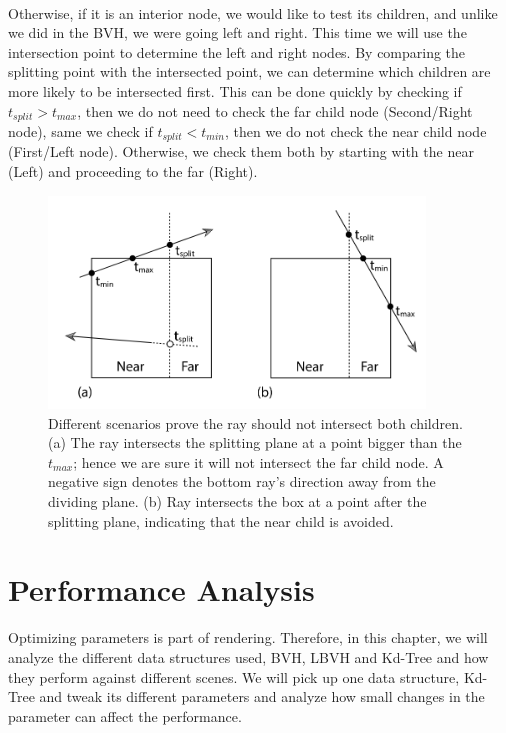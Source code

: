 \documentclass[11pt,a4paper]{article}
\begin{document}
\noindent
\\
Otherwise, if it is an interior node, we would like to test its children, and unlike we did in the BVH, we were going left and right. This time we will use the intersection point to determine the left and right nodes. By comparing the splitting point with the intersected point, we can determine which children are more likely to be intersected first. This can be done quickly by checking if $t_{split} > t_{max}$, then we do not need to check the far child node (Second/Right node), same we check if $t_{split} < t_{min}$, then we do not check the near child node (First/Left node). Otherwise, we check them both by starting with the near (Left) and proceeding to the far (Right).   

\begin{figure}[H]	
     \centering
     \captionsetup{justification=centering,margin=2cm}
     \includegraphics[width=10cm]{images/kdtree/traversal_case.png}
     \caption{Different scenarios prove the ray should not intersect both children. (a) The ray intersects the splitting plane at a point bigger than the $t_{max}$; hence we are sure it will not intersect the far child node. A negative sign denotes the bottom ray's direction away from the dividing plane. (b) Ray intersects the box at a point after the splitting plane, indicating that the near child is avoided.  \protect\cite{Pharr2016}}
        \label{fig:dice}
\end{figure}

\clearpage

\section{Performance Analysis}
 Optimizing parameters is part of rendering. Therefore, in this chapter, we will analyze the different data structures used, BVH, LBVH and Kd-Tree and how they perform against different scenes. We will pick up one data structure, Kd-Tree and tweak its different parameters and analyze how small changes in the parameter can affect the performance.
\end{document}
